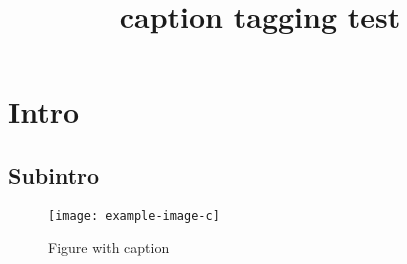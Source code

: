 \documentclass{article}
\title{caption tagging test}
\begin{document}
\listoffigures

\section{Intro}
\subsection{Subintro}

\begin{figure}[h]
  \centering
  \texttt{[image: example-image-c]}%
  \caption{Figure with caption}
\end{figure}
\end{document}
